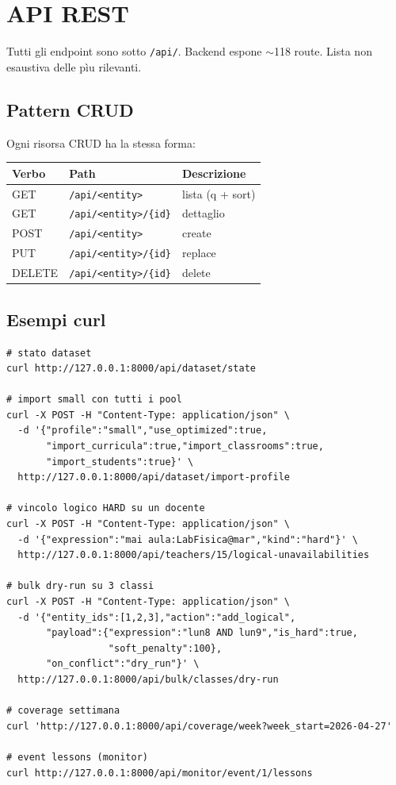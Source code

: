 \chapter{API REST}

Tutti gli endpoint sono sotto \texttt{/api/}. Backend espone $\sim$118
route. Lista non esaustiva delle p\`iu rilevanti.

\section{Pattern CRUD}

Ogni risorsa CRUD ha la stessa forma:

\begin{center}
\small
\begin{tabular}{l l l}
\toprule
Verbo & Path & Descrizione \\
\midrule
GET    & \texttt{/api/<entity>}      & lista (q + sort)  \\
GET    & \texttt{/api/<entity>/\{id\}} & dettaglio       \\
POST   & \texttt{/api/<entity>}      & create           \\
PUT    & \texttt{/api/<entity>/\{id\}} & replace        \\
DELETE & \texttt{/api/<entity>/\{id\}} & delete         \\
\bottomrule
\end{tabular}
\end{center}

\section{Esempi curl}

\begin{lstlisting}[style=shell]
# stato dataset
curl http://127.0.0.1:8000/api/dataset/state

# import small con tutti i pool
curl -X POST -H "Content-Type: application/json" \
  -d '{"profile":"small","use_optimized":true,
       "import_curricula":true,"import_classrooms":true,
       "import_students":true}' \
  http://127.0.0.1:8000/api/dataset/import-profile

# vincolo logico HARD su un docente
curl -X POST -H "Content-Type: application/json" \
  -d '{"expression":"mai aula:LabFisica@mar","kind":"hard"}' \
  http://127.0.0.1:8000/api/teachers/15/logical-unavailabilities

# bulk dry-run su 3 classi
curl -X POST -H "Content-Type: application/json" \
  -d '{"entity_ids":[1,2,3],"action":"add_logical",
       "payload":{"expression":"lun8 AND lun9","is_hard":true,
                  "soft_penalty":100},
       "on_conflict":"dry_run"}' \
  http://127.0.0.1:8000/api/bulk/classes/dry-run

# coverage settimana
curl 'http://127.0.0.1:8000/api/coverage/week?week_start=2026-04-27'

# event lessons (monitor)
curl http://127.0.0.1:8000/api/monitor/event/1/lessons
\end{lstlisting}

